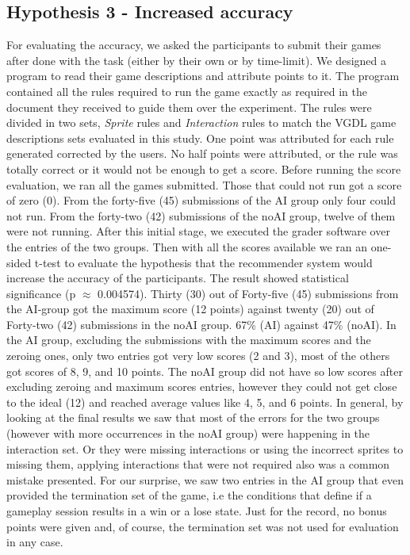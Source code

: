 \documentclass[letterpaper]{article} %
\begin{document}
\subsection{Hypothesis 3 - Increased accuracy}
For evaluating the accuracy, we asked the participants to submit their games after done with the task (either by their own or by time-limit). We designed a program to read their game descriptions and attribute points to it. The program contained all the rules required to run the game exactly as required in the document they received to guide them over the experiment. The rules were divided in two sets, \textit{Sprite} rules and \textit{Interaction} rules to match the VGDL game descriptions sets evaluated in this study. One point was attributed for each rule generated corrected by the users. No half points were attributed, or the rule was totally correct or it would not be enough to get a score. Before running the score evaluation, we ran all the games submitted. Those that could not run got a score of zero (0). From the forty-five (45) submissions of the AI group only four could not run. From the forty-two (42) submissions of the noAI group, twelve of them were not running. After this initial stage, we executed the grader software over the entries of the two groups. Then with all the scores available we ran an one-sided t-test to evaluate the hypothesis that the recommender system would increase the accuracy of the participants. The result showed statistical significance (p $\approx$ 0.004574). Thirty (30) out of Forty-five (45) submissions from the AI-group got the maximum score (12 points) against twenty (20) out of Forty-two (42) submissions in the noAI group. 67\% (AI) against 47\% (noAI). In the AI group, excluding the submissions with the maximum scores and the zeroing ones, only two entries got very low scores (2 and 3), most of the others got scores of 8, 9, and 10 points. The noAI group did not have so low scores after excluding zeroing and maximum scores entries, however they could not get close to the ideal (12) and reached average values like 4, 5, and 6 points. In general, by looking at the final results we saw that most of the errors for the two groups (however with more occurrences in the noAI group) were happening in the interaction set. Or they were missing interactions or using the incorrect sprites to missing them, applying interactions that were not required also was a common mistake presented. For our surprise, we saw two entries in the AI group that even provided the termination set of the game, i.e the conditions that define if a gameplay session results in a win or a lose state. Just for the record, no bonus points were given and, of course, the termination set was not used for evaluation in any case.
\end{document}
